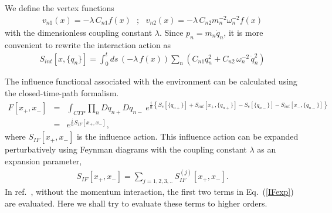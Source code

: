 \documentclass[%
amssymb,preprint,preprintnumbers,nofootinbib,superscriptaddress]{revtex4}
\begin{document}
We define the vertex functions 
\begin{eqnarray}
    v_{n1}(x)=-\lambda\, C_{n1}f(x)\ \ \ ;\ \ \  v_{n2}(x)=-\lambda\,C_{n2}m_{n}^{-2}\omega_{n}^{-2}f(x)
\end{eqnarray}
with the dimensionless coupling constant $\lambda$. Since $p_{n}=m_{n}\dot{q}_{n}$, it is more convenient to rewrite the interaction action as
\begin{eqnarray}\label{Sint1}
    S_{int}[x,\{q_{n}\}]=\int_{0}^{t}ds\,(-\lambda\,f(x))\sum_{n}\left(C_{n1}q_{n}^{2}+C_{n2}\,\omega_{n}^{-2}\,\dot{q}_{n}^{2}\right)
\end{eqnarray}

The influence functional associated with the environment can be calculated using the closed-time-path formalism.
\begin{eqnarray}\label{CTPform}
F[x_{+},x_{-}]&=&\int_{CTP}\prod_{n}Dq_{n+}Dq_{n-}\ \!e^{\frac{i}{\hbar}\left\{S_{e}[\{q_{n+}\}]+S_{int}[x_{+},\{q_{n+}\}]-S_{e}[\{q_{n-}\}]-S_{int}[x_{-},\{q_{n-}\}]\right\}}\nonumber\\
&=&e^{\frac{i}{\hbar}S_{IF}[x_{+},x_{-}]},
\end{eqnarray}
where $S_{IF}[x_{+},x_{-}]$ is the influence action. This influence action can be expanded perturbatively using Feynman diagrams with the coupling constant $\lambda$ as an expansion parameter,
\begin{eqnarray}\label{IFexp}
S_{IF}[x_{+},x_{-}]=\sum_{j=1,2,3,..}S_{IF}^{(j)}[x_{+},x_{-}].
\end{eqnarray}
In ref.~\cite{HPZ93}, without the momentum interaction, the first two terms in Eq.~(\ref{IFexp}) are evaluated. Here we shall try to evaluate these terms to higher orders.
\end{document}
